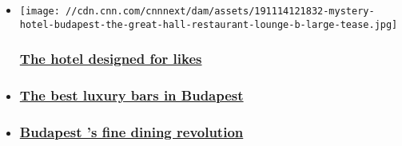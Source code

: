 \begin{itemize}
\item
  \href{/travel/article/mystery-hotel-budapest/index.html}{}

  \texttt{[image: //cdn.cnn.com/cnnnext/dam/assets/191114121832-mystery-hotel-budapest-the-great-hall-restaurant-lounge-b-large-tease.jpg]}

  \hypertarget{the-hotel-designed-for-likes}{%
  \subsubsection{\texorpdfstring{\href{/travel/article/mystery-hotel-budapest/index.html}{The
  hotel designed for
  likes}}{The hotel designed for likes}}\label{the-hotel-designed-for-likes}}
\item
  \hypertarget{the-best-luxury-bars-in-budapest}{%
  \subsubsection{\texorpdfstring{\href{/travel/article/luxury-bars-budapest/index.html}{The
  best luxury bars in
  Budapest}}{The best luxury bars in Budapest}}\label{the-best-luxury-bars-in-budapest}}
\item
  \hypertarget{budapest-s-fine-dining-revolution}{%
  \subsubsection{\texorpdfstring{\href{/travel/article/fine-dining-budapest/index.html}{Budapest
  's fine dining
  revolution}}{Budapest 's fine dining revolution}}\label{budapest-s-fine-dining-revolution}}
\end{itemize}

